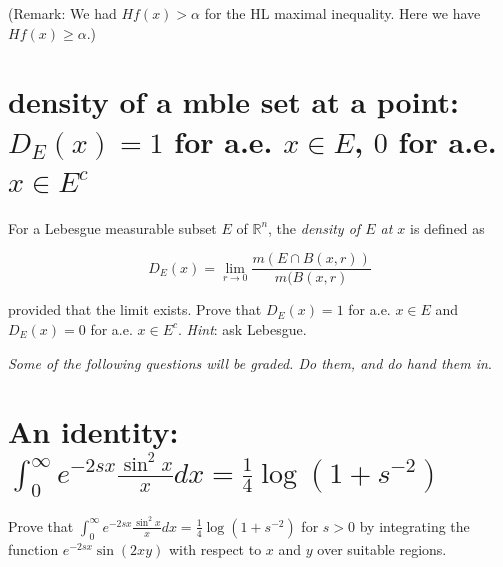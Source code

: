 \documentclass{qlnotes-export}
\begin{document}
(Remark: We had \(Hf(x) > \alpha\) for the HL maximal inequality. Here we have \(Hf(x) \geq \alpha\).)

\section{\texorpdfstring{density of a mble set at a point: \(D_{E}(x) = 1\) for a.e. \(x \in E\), \(0\) for a.e. \(x \in E^{c}\)}{density of a mble set at a point: D\_\{E\}(x) = 1 for a.e. x \textbackslash in E, 0 for a.e. x \textbackslash in E\^{}\{c\}}}

For a Lebesgue measurable subset \(E\) of \({\mathbb{R}}^{n}\), the \emph{density of \(E\) at \(x\)} is defined as

\[D_{E}(x) = \lim\limits_{r\rightarrow 0}\frac{m(E \cap B(x,r))}{m(B(x,r)}\]

provided that the limit exists. Prove that \(D_{E}(x) = 1\) for a.e. \(x \in E\) and \(D_{E}(x) = 0\) for a.e. \(x \in E^{c}\). \emph{Hint}: ask Lebesgue.

\emph{Some of the following questions will be graded. Do them, and do hand them in}.

\section{\texorpdfstring{An identity: \(\int_{0}^{\infty}e^{- 2sx}\frac{\sin^{2}x}{x} dx = \frac{1}{4}\log(1 + s^{- 2})\)}{An identity: \textbackslash int\_\{0\}\^{}\{\textbackslash infty\}e\^{}\{- 2sx\}\textbackslash frac\{\textbackslash sin\^{}\{2\}x\}\{x\} dx = \textbackslash frac\{1\}\{4\}\textbackslash log(1 + s\^{}\{- 2\})}}\label{an-identity-int_0infty-e-2sxfracsin2xxd-xfrac14log1s-2}

Prove that \(\int_{0}^{\infty}e^{- 2sx}\frac{\sin^{2}x}{x} dx = \frac{1}{4}\log(1 + s^{- 2})\) for \(s > 0\) by integrating the function \(e^{- 2sx}\sin(2xy)\) with respect to \(x\) and \(y\) over suitable regions.
\end{document}
